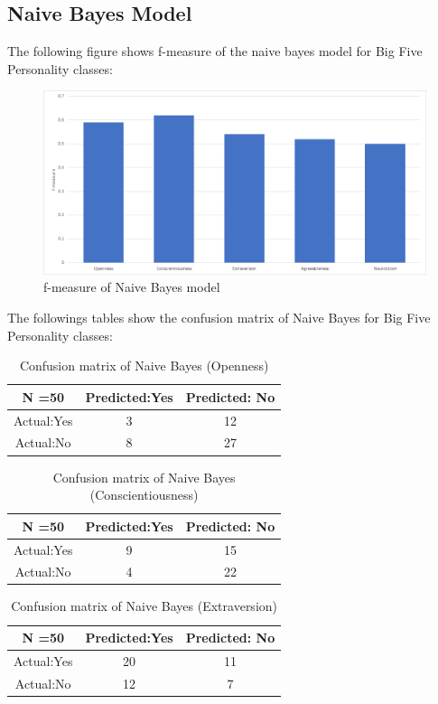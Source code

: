 \subsection{Naive Bayes Model}
The following figure shows f-measure of the naive bayes model for Big Five Personality classes:
\begin{figure}[!ht]
\centering
\includegraphics[width = \textwidth ]{fig/f-measure_naivebayes.png}
\caption{f-measure of Naive Bayes model}
\label{fig:f-measure_naivebayes}
\end{figure}

The followings tables show the confusion matrix of Naive Bayes for Big Five Personality classes:
\begin{table}[!ht]
\centering
\begin{tabular}{ |c|c|c| } 
 \hline
 N =50 & Predicted:Yes & Predicted: No \\
 \hline
 Actual:Yes&3 & 12 \\ 
 \hline
 Actual:No&8 & 27 \\ 
 \hline
\end{tabular}
\caption{Confusion matrix of Naive Bayes (Openness)}

\end{table}

\begin{table}[!ht]
\centering
\begin{tabular}{ |c|c|c| } 
 \hline
 N =50 & Predicted:Yes & Predicted: No \\
 \hline
 Actual:Yes&9 & 15 \\ 
 \hline
 Actual:No&4 & 22 \\ 
 \hline
\end{tabular}
\caption{Confusion matrix of Naive Bayes (Conscientiousness)}
\end{table}

\begin{table}[!ht]
\centering
\begin{tabular}{ |c|c|c| } 
 \hline
 N =50 & Predicted:Yes & Predicted: No \\
 \hline
 Actual:Yes&20 & 11 \\ 
 \hline
 Actual:No&12 & 7 \\ 
 \hline
\end{tabular}
 \caption{Confusion matrix of Naive Bayes (Extraversion)}
\end{table}

